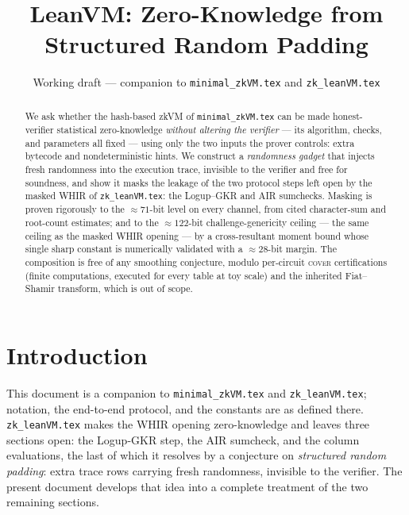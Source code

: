 \documentclass{article}
\title{LeanVM: Zero-Knowledge from Structured Random Padding}
\author{Working draft --- companion to \texttt{minimal\_zkVM.tex} and \texttt{zk\_leanVM.tex}}
\date{}
\theoremstyle{definition}
\begin{document}
\maketitle

\begin{abstract}
We ask whether the hash-based zkVM of \texttt{minimal\_zkVM.tex} can be made honest-verifier statistical zero-knowledge \emph{without altering the verifier} --- its algorithm, checks, and parameters all fixed --- using only the two inputs the prover controls: extra bytecode and nondeterministic hints. We construct a \emph{randomness gadget} that injects fresh randomness into the execution trace, invisible to the verifier and free for soundness, and show it masks the leakage of the two protocol steps left open by the masked WHIR of \texttt{zk\_leanVM.tex}: the Logup--GKR and AIR sumchecks. Masking is proven rigorously to the $\approx 71$-bit level on every channel, from cited character-sum and root-count estimates; and to the $\approx 122$-bit challenge-genericity ceiling --- the same ceiling as the masked WHIR opening --- by a cross-resultant moment bound whose single sharp constant is numerically validated with a $\approx 28$-bit margin. The composition is free of any smoothing conjecture, modulo per-circuit \textsc{cover} certifications (finite computations, executed for every table at toy scale) and the inherited Fiat--Shamir transform, which is out of scope.
\end{abstract}

\section{Introduction}

This document is a companion to \texttt{minimal\_zkVM.tex} and \texttt{zk\_leanVM.tex}; notation, the end-to-end protocol, and the constants are as defined there. \texttt{zk\_leanVM.tex} makes the WHIR opening zero-knowledge and leaves three sections open: the Logup-GKR step, the AIR sumcheck, and the column evaluations, the last of which it resolves by a conjecture on \emph{structured random padding}: extra trace rows carrying fresh randomness, invisible to the verifier. The present document develops that idea into a complete treatment of the two remaining sections.
\end{document}

